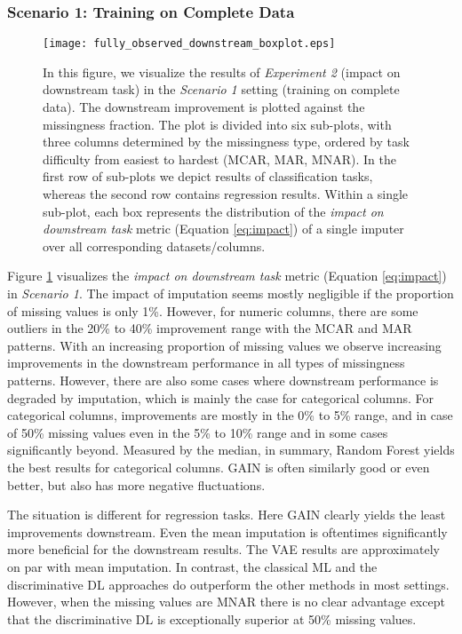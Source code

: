 \subsubsection{Scenario 1: Training on Complete Data}


\begin{figure}\centering
	\texttt{[image: fully\_observed\_downstream\_boxplot.eps]}

	\caption[Downstream Ranks - Fully Observed]{In this figure, we visualize the results of \textit{Experiment 2} (impact on downstream task) in the \textit{Scenario 1} setting (training on complete data). The downstream improvement is plotted against the missingness fraction. The plot is divided into six sub-plots, with three columns determined by the missingness type, ordered by task difficulty from easiest to hardest (MCAR, MAR, MNAR). In the first row of sub-plots we depict results of classification tasks, whereas the second row contains regression results. Within a single sub-plot, each box represents the distribution of the \textit{impact on downstream task} metric (Equation \ref{eq:impact}) of a single imputer over all corresponding datasets/columns.
    }
	\label{fig:fully_observed_downstream_boxplot}
\end{figure}

Figure \ref{fig:fully_observed_downstream_boxplot} visualizes the \textit{impact on downstream task} metric (Equation \ref{eq:impact}) in \textit{Scenario 1}. The impact of imputation seems mostly negligible if the proportion of missing values is only 1\%. However, for numeric columns, there are some outliers in the 20\% to 40\% improvement range with the MCAR and MAR patterns. With an increasing proportion of missing values we observe increasing improvements in the downstream performance in all types of missingness patterns. However, there are also some cases where downstream performance is degraded by imputation, which is mainly the case for categorical columns. For categorical columns, improvements are mostly in the 0\% to 5\% range, and in case of 50\% missing values even in the 5\% to 10\% range and in some cases significantly beyond. Measured by the median, in summary, Random Forest yields the best results for categorical columns. GAIN is often similarly good or even better, but also has more negative fluctuations.

The situation is different for regression tasks. Here GAIN clearly yields the least improvements downstream. Even the mean imputation is oftentimes significantly more beneficial for the downstream results. The VAE results are approximately on par with mean imputation. In contrast, the classical ML and the discriminative DL approaches do outperform the other methods in most settings. However, when the missing values are MNAR there is no clear advantage except that the discriminative DL is exceptionally superior at 50\% missing values.


